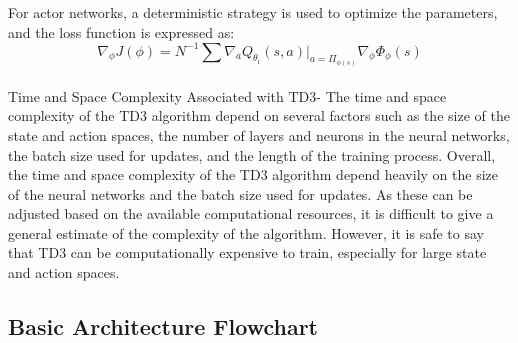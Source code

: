 \documentclass[conference]{IEEEtran}
\begin{document}
For actor networks, a deterministic strategy is used to optimize the parameters, and the loss function is expressed as:
\begin{equation}
\label{eq:second}
{\nabla_\phi}{J(\phi)}=N^{-1}\sum\nabla_{a}Q_{\theta_i}(s,a)|_{a=\Pi_{\phi(s)}}\nabla_{\phi}\Phi_\phi(s)
\end{equation}\\


Time and Space Complexity Associated with TD3-
The time and space complexity of the TD3 algorithm depend on several factors such as the size of the state and action spaces, the number of layers and neurons in the neural networks, the batch size used for updates, and the length of the training process. 
Overall, the time and space complexity of the TD3 algorithm depend heavily on the size of the neural networks and the batch size used for updates. As these can be adjusted based on the available computational resources, it is difficult to give a general estimate of the complexity of the algorithm. However, it is safe to say that TD3 can be computationally expensive to train, especially for large state and action spaces.


\subsection{Basic Architecture Flowchart}\\
\end{document}
